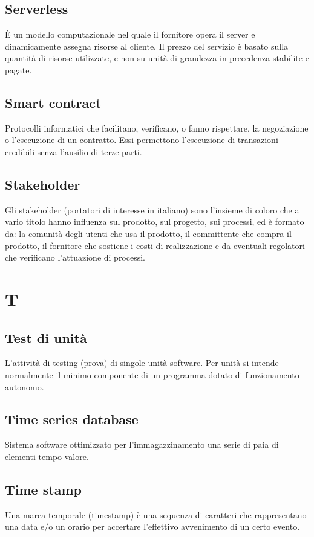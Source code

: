 \subsection*{Serverless}
È un modello computazionale nel quale il fornitore opera il server e dinamicamente assegna risorse al cliente. Il prezzo del servizio è basato sulla quantità di risorse utilizzate, e non su unità di grandezza in precedenza stabilite e pagate.

\subsection*{Smart contract}
Protocolli informatici che facilitano, verificano, o fanno rispettare, la negoziazione o l'esecuzione di un contratto. Essi permettono l'esecuzione di transazioni credibili senza l'ausilio di terze parti.

\subsection*{Stakeholder}
Gli stakeholder (portatori di interesse in italiano) sono l’insieme di coloro che a vario titolo hanno influenza sul prodotto, sul progetto, sui processi, ed è formato da: la comunità degli utenti che usa il prodotto, il committente che compra il prodotto, il fornitore che sostiene i costi di realizzazione e da eventuali regolatori che verificano l’attuazione di processi.



\section*{T}

\subsection{Test di unità}
L'attività di testing (prova) di singole unità software. Per unità si intende normalmente il minimo componente di un programma dotato di funzionamento autonomo.

\subsection*{Time series database}
Sistema software ottimizzato per l'immagazzinamento una serie di paia di elementi tempo-valore.

\subsection*{Time stamp}
Una marca temporale (timestamp) è una sequenza di caratteri che rappresentano una data e/o un orario per accertare l'effettivo avvenimento di un certo evento. 

